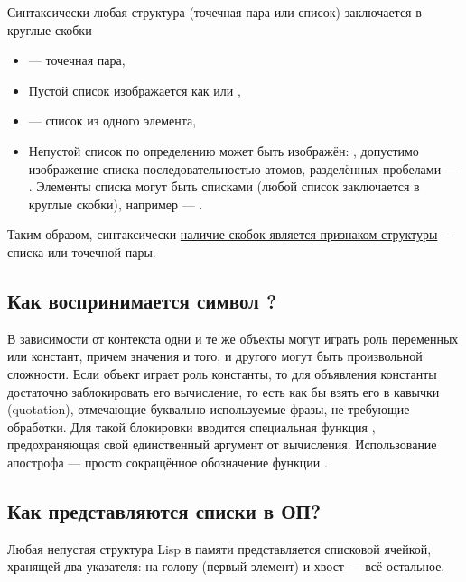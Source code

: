 \documentclass[a4paper]{report}
\begin{document}
Синтаксически любая структура (точечная пара или список) заключается в круглые скобки
\begin{itemize}
	\item {} — точечная пара,
	\item Пустой список изображается как  или \code{()},
	\item {} — список из одного элемента,
	\item Непустой список по определению может быть изображён: , допустимо изображение списка последовательностью атомов, разделённых пробелами — .
	Элементы списка могут быть списками (любой список заключается в круглые скобки), например — .
\end{itemize}
Таким образом, синтаксически \underline{наличие скобок является признаком структуры} — списка или точечной пары. 

\subsection*{Как воспринимается символ ?}

В зависимости от контекста одни и те же объекты могут играть роль переменных или констант, причем значения и того, и другого могут быть произвольной сложности.
Если объект играет роль константы, то для объявления константы достаточно заблокировать его вычисление, то есть как бы взять его в кавычки (quotation), отмечающие буквально используемые фразы, не требующие обработки.
Для такой блокировки вводится специальная функция , предохраняющая свой единственный аргумент от вычисления.
Использование апострофа  — просто сокращённое обозначение функции .

\subsection*{Как представляются списки в ОП?}

Любая непустая структура Lisp в памяти представляется списковой ячейкой, хранящей два указателя: на голову (первый элемент) и хвост — всё остальное.
\end{document}
